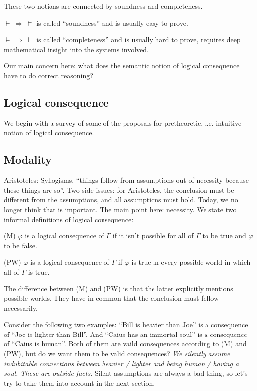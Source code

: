 \documentclass[a4paper]{article}
\newcommand{\Arr}{\Rightarrow}
\begin{document}
These two notions are connected by soundness and completeness.

$\vdash\ \Arr\ \models$ is called ``soundness'' and is usually easy to prove.

$\models\ \Arr\ \vdash$ is called ``completeness'' and is usually hard to prove,
requires deep mathematical insight into the systems involved.

Our main concern here: what does the semantic notion of logical consequence have
to do correct reasoning?

\subsection{Logical consequence}

We begin with a survey of some of the proposals for pretheoretic, i.e. intuitive
notion of logical consequence.

\subsection{Modality}

Aristoteles: Syllogisms.  ``things follow from assumptions out of necessity
because these things are so''.  Two side issues: for Aristoteles, the conclusion
must be different from the assumptions, and all assumptions must hold.  Today,
we no longer think that is important.  The main point here: necessity.  We state
two informal definitions of logical consequence:

(M) $\varphi$ is a logical consequence of $\Gamma$ if it isn't possible for all
of $\Gamma$ to be true and $\varphi$ to be false.

(PW) $\varphi$ is a logical consequence of $\Gamma$ if $\varphi$ is true in
every possible world in which all of $\Gamma$ is true.

The difference between (M) and (PW) is that the latter explicitly mentions
possible worlds.  They have in common that the conclusion must follow
necessarily.

Consider the following two examples:  ``Bill is heavier than Joe'' is a
consequence of ``Joe is lighter than Bill''. And ``Caius has an immortal soul''
is a consequence of ``Caius is human''.  Both of them are vaild consequences
according to (M) and (PW), but do we want them to be valid consequences?
\emph{We silently assume indubitable connections between heavier / lighter and
being human / having a soul.  These are outside facts.}  Silent assumptions are
always a bad thing, so let's try to take them into account in the next section.
\end{document}
